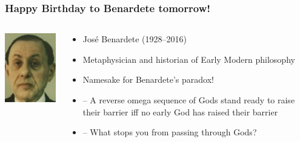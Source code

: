 \begin{frame}
  \frametitle{Happy Birthday to Benardete tomorrow!}

  \begin{columns}
    \begin{column}{.35\textwidth}
      \includegraphics[height=.6\textheight]{../assets/Benardete_photo}
    \end{column}
    \begin{column}{.7\textwidth}
      \begin{itemize}[<+->]
        \item Jos{\'e} Benardete (1928--2016)
        
        
        \item Metaphysician and historian of Early Modern philosophy 
        
        \item Namesake for Benardete's paradox!
        
        \item[] -- A reverse omega sequence of Gods stand ready to raise their barrier iff no early God has raised their barrier
        \item[] -- What stops you from passing through Gods?
      \end{itemize}
    \end{column}
  \end{columns}
\end{frame}

